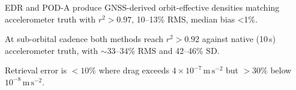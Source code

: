 \documentclass{agujournal2019}
\begin{document}


\begin{keypoints}
\item EDR and POD-A produce GNSS-derived orbit-effective densities matching accelerometer truth with $r^{2}>0.97$, 10--13\% RMS, median bias <1\%.
\item At sub-orbital cadence both methods reach $r^{2}>0.92$ against native (10\,s) accelerometer truth, with $\sim$33--34\% RMS and 42--46\% SD.
\item Retrieval error is $<10\%$ where drag exceeds $4 \times 10^{-7}\,\mathrm{m\,s^{-2}}$ but $>30\%$ below $10^{-8}\,\mathrm{m\,s^{-2}}$.
\end{keypoints}

%
%

%
%

\end{document}
